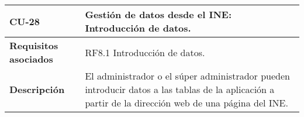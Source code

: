 \newpage
\begin{longtable}[t]{@{}ll@{}}
\toprule
\begin{minipage}[t]{0.23\columnwidth}\raggedright\strut
\textbf{CU-28}\strut
\end{minipage} & \begin{minipage}[b]{0.71\columnwidth}\raggedright\strut
\textbf{Gestión de datos desde el INE: Introducción de datos.}\strut
\end{minipage}\tabularnewline
\midrule
\endhead
\begin{minipage}[t]{0.23\columnwidth}\raggedright\strut
\textbf{Requisitos asociados}\strut
\end{minipage} & \begin{minipage}[t]{0.71\columnwidth}\raggedright\strut
RF8.1  Introducción de datos. \strut
\end{minipage}\tabularnewline
\begin{minipage}[t]{0.23\columnwidth}\raggedright\strut
\textbf{Descripción}\strut
\end{minipage} & \begin{minipage}[t]{0.71\columnwidth}\raggedright\strut
El administrador o el súper administrador pueden introducir datos a las tablas de la aplicación a partir de la dirección web de una página del INE.


\end{minipage}
\end{longtable}
